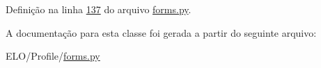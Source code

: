 Definição na linha \hyperlink{Profile_2forms_8py_source_l00137}{137} do arquivo \hyperlink{Profile_2forms_8py_source}{forms.\+py}.



A documentação para esta classe foi gerada a partir do seguinte arquivo\+:\begin{DoxyCompactItemize}
\item 
E\+L\+O/\+Profile/\hyperlink{Profile_2forms_8py}{forms.\+py}\end{DoxyCompactItemize}
